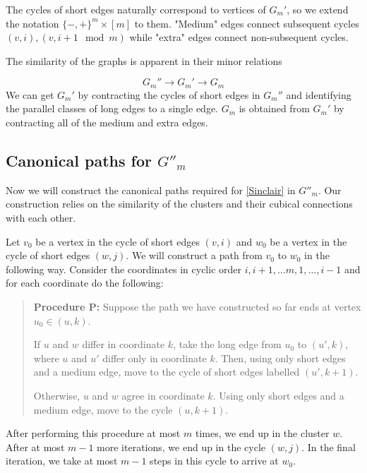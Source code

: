 \documentclass[a4paper,12pt]{book}
\theoremstyle{plain}
\theoremstyle{definition}
\begin{document}
The cycles of short edges naturally correspond to vertices of $G_m'$, so we extend the notation $\{-,+\}^m \times [m]$ to them. "Medium" edges connect subsequent cycles $(v,i), (v,i+1 \mod m)$ while "extra" edges connect non-subsequent cycles. 

The similarity of the graphs is apparent in their minor relations

\begin {equation}
G_m'' \rightarrow G_m' \rightarrow G_m
\end{equation}
We can get $G_m'$ by contracting the cycles of short edges in $G_m''$ and identifying the parallel classes of long edges 
to a single edge. $G_m$ is obtained from $G_m'$ by contracting all of the medium and extra edges.


\subsection{Canonical paths for $G''_m$}
\label{canpaths}

Now we will construct the canonical paths required for \ref{Sinclair} in $G''_m$. Our construction relies on the similarity
of the clusters and their cubical connections with each other.

Let $v_0$ be a vertex in the cycle of short edges $(v,i)$ and $w_0$ be a vertex in the cycle of short edges $(w,j)$. 
We will construct a path from $v_0$ to $w_0$ in the following way. Consider the coordinates in cyclic order $i, i+1, \dots m, 1, \dots,
i-1$ and for each coordinate do the following:

\begin{quote}
\textbf{Procedure P:}
Suppose the path we have constructed so far ends at vertex $u_0 \in (u,k)$.
\begin{compactitem}
\item If $u$ and $w$ differ in coordinate $k$, take the long edge from $u_0$ to $(u',k)$,
where $u$ and $u'$ differ only in coordinate $k$. Then, using only short edges and a medium edge,
move to the cycle of short edges labelled $(u', k+1)$.
\item Otherwise, $u$ and $w$ agree in coordinate $k$. Using only short edges and a medium edge,
move to the cycle $(u, k+1)$.
\end{compactitem}
\end{quote}

After performing this procedure at most $m$ times, we end up in the cluster $w$. After at most $m-1$ more
iterations, we end up in the cycle $(w,j)$. In the final iteration, we take at most $m-1$ steps in this cycle to arrive
at $w_0$.
\end{document}
